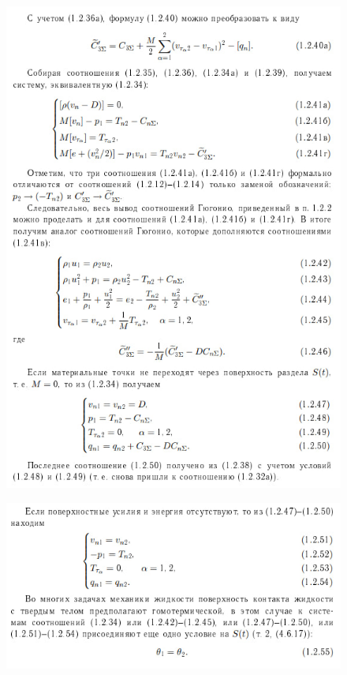 \begin{figure}[h!]
	\centering
	\includegraphics[width=0.9\linewidth]{semester8/img/33_2}
\end{figure}

\begin{figure}[H]
	\includegraphics[width=0.9\linewidth]{semester8/img/33_3}
\end{figure}


